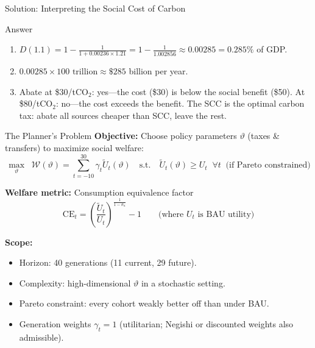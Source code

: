 \documentclass[aspectratio=169,11pt]{beamer}
\newcommand{\emphc}[1]{\textcolor{harvardcrimson}{#1}}
\begin{document}
\begin{frame}{Solution: Interpreting the Social Cost of Carbon}
\begin{block}{Answer}
\begin{enumerate}
    \item $D(1.1) = 1 - \frac{1}{1 + 0.00236 \times 1.21} = 1 - \frac{1}{1.002856} \approx 0.00285 = 0.285\%$ of GDP.
    \item $0.00285 \times 100\text{ trillion} \approx \$285$ billion per year.
    \item Abate at \$30/tCO$_2$: \emphc{yes}---the cost (\$30) is below the social benefit (\$50).  At \$80/tCO$_2$: \emphc{no}---the cost exceeds the benefit.  The SCC is the \emphc{optimal carbon tax}: abate all sources cheaper than SCC, leave the rest.
\end{enumerate}
\end{block}
\end{frame}

\begin{frame}{The Planner's Problem}
\footnotesize
\textbf{Objective:} Choose policy parameters $\vartheta$ (taxes \& transfers) to maximize social welfare:
\[
\max_\vartheta \;\; \mathcal{W}(\vartheta) = \sum_{t=-10}^{30} \gamma_t \tilde{U}_t(\vartheta) \quad \text{s.t.} \quad \tilde{U}_t(\vartheta) \geq U_t \;\; \forall t \;\; \text{(if Pareto constrained)}
\]

\textbf{Welfare metric:} Consumption equivalence factor
\[
\mathrm{CE}_t = \left(\frac{\tilde{U}_t}{U_t}\right)^{\frac{1}{1-\sigma_u}} - 1 \qquad \text{(where $U_t$ is BAU utility)}
\]

\textbf{Scope:}
\begin{itemize}\itemsep0pt
    \item Horizon: 40 generations (11 current, 29 future).
    \item Complexity: high-dimensional $\vartheta$ in a stochastic setting.
    \item Pareto constraint: every cohort weakly better off than under BAU.
    \item Generation weights $\gamma_t = 1$ (utilitarian; Negishi or discounted weights also admissible).
\end{itemize}
\end{frame}

\end{document}
